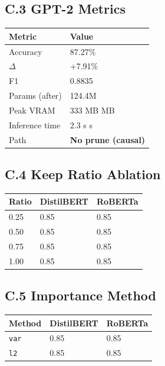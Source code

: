 \subsection{C.3 GPT-2 Metrics}

\begin{table}[H]
\centering
\small
\begin{tabular}{ll}
\toprule
\textbf{Metric} & \textbf{Value} \\
\midrule
Accuracy & 87.27\% \\
$\Delta$ & +7.91\% \\
F1 & 0.8835 \\
Params (after) & 124.4M \\
Peak VRAM & 333 MB MB \\
Inference time & 2.3 s s \\
Path & \textbf{No prune (causal)} \\
\bottomrule
\end{tabular}
\end{table}

\subsection{C.4 Keep Ratio Ablation}

\begin{table}[H]
\centering
\small
\begin{tabular}{lll}
\toprule
\textbf{Ratio} & \textbf{DistilBERT} & \textbf{RoBERTa} \\
\midrule
0.25 & 0.85 & 0.85 \\
0.50 & 0.85 & 0.85 \\
0.75 & 0.85 & 0.85 \\
1.00 & 0.85 & 0.85 \\
\bottomrule
\end{tabular}
\end{table}

\subsection{C.5 Importance Method}

\begin{table}[H]
\centering
\small
\begin{tabular}{lll}
\toprule
\textbf{Method} & \textbf{DistilBERT} & \textbf{RoBERTa} \\
\midrule
\texttt{var} & 0.85 & 0.85 \\
\texttt{l2} & 0.85 & 0.85 \\
\bottomrule
\end{tabular}
\end{table}

